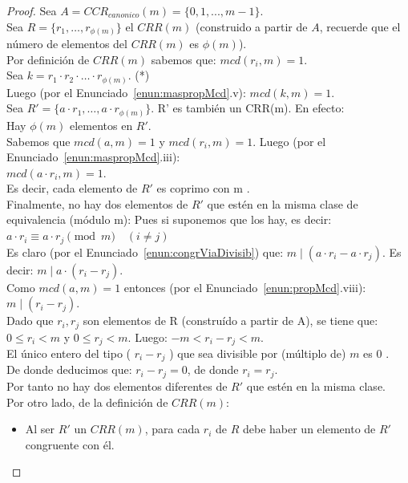 \begin{proof} Sea $A = CCR_{canonico}(m)=\{0,1,...,m-1\}$. \\
Sea $R=\{r_1, \ldots, r_{\phi(m)}\}$ el $CRR(m)$ (construido a partir de $A$, recuerde que el número de elementos del $CRR(m)$ es $\phi(m)$). \\
Por definición de $CRR(m)$ sabemos que: $mcd(r_{i}, m)=1$. \\
Sea $k=r_{1} \cdot r_{2} \cdot \ldots \cdot r_{\phi(m)}$. \quad\quad\quad\quad\quad\quad\quad\quad\quad\quad\quad\quad\quad\quad (*) \\
Luego (por el Enunciado~\ref{enun:maspropMcd}.v): $mcd(k, m)=1$. \\
Sea $R'=\{a \cdot r_{1}, \ldots, a \cdot r_{\phi(m)}\}$. R' es también un CRR(m). En efecto:\\
Hay $\phi(m)$ elementos en $R'$.\\
Sabemos que $mcd(a, m)=1$ y $mcd(r_{i}, m)=1$. Luego (por el Enunciado~\ref{enun:maspropMcd}.iii):\\
$mcd(a \cdot r_{i}, m)=1$. \\
Es decir, cada elemento de $R'$ es coprimo con m .\\
Finalmente, no hay dos elementos de $R'$ que estén en la misma clase de equivalencia (módulo m): Pues si suponemos que los hay, es decir: \\
$a \cdot r_{i} \equiv a \cdot r_j{} \pmod m \quad (i\neq j)$ \\
Es claro (por el Enunciado~\ref{enun:congrViaDivisib}) que: $m \mid (a \cdot r_{i}-a \cdot r_{j})$. Es decir: $m \mid a \cdot(r_{i}-r_{j})$.\\
Como $mcd(a, m)=1$ entonces (por el Enunciado~\ref{enun:propMcd}.viii): $m \mid (r_{i}-r_{j})$.\\
Dado que $r_{i}, r_{j}$ son elementos de R (construído a partir de A), se tiene que:\\
$0 \leq r_{i}<m$ y $0 \leq r_{j}<m$. Luego: $-m<r_{i}-r_{j}<m$.\\
El único entero del tipo ( $r_{i}-r_{j}$ ) que sea divisible por (múltiplo de) $m$ es 0 .\\
De donde deducimos que: $r_{i}-r_{j}=0$, de donde $r_{i}=r_{j}$.\\
Por tanto no hay dos elementos diferentes de $R'$ que estén en la misma clase.\\
Por otro lado, de la definición de $CRR(m)$:
\begin{itemize}
  \item Al ser $R'$ un $CRR(m)$, para cada $r_{i}$ de $R$ debe haber un elemento de $R'$ congruente con él.

\end{itemize}
\end{proof}
